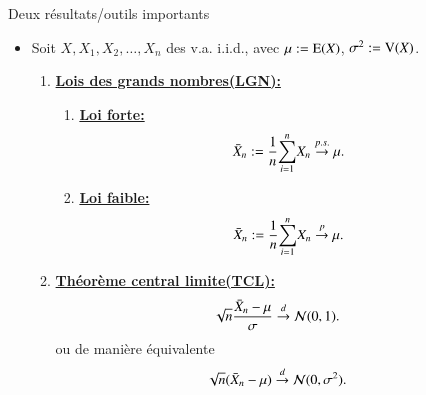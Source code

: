 \begin{frame}[allowframebreaks]{Deux résultats/outils importants}
    \begin{itemize}
        \item  Soit $X, X_1, X_2, \ldots, X_n$ des v.a. i.i.d., avec $\mu:=\operatorname{E}(X)$, 
    $\sigma^2 := \operatorname{V}(X)$.
    \begin{enumerate}
        \item \textbf{\underline{Lois des grands nombres(LGN):}}
        \begin{enumerate}[-]
            \item \textbf{\underline{Loi forte:}}
            \begin{align*}
                \bar{X}_n := \frac{1}{n}{\sum_{i=1}^n} X_n &\overset{p.s.}{\rightarrow}\mu.
            \end{align*}
            \item \textbf{\underline{Loi faible:}}
            \begin{align*}
                \bar{X}_n := \frac{1}{n}{\sum_{i=1}^n} X_n &\overset{p}{\rightarrow} \mu.
            \end{align*}
        \end{enumerate}
        \framebreak
        \item \textbf{\underline{Théorème central limite(TCL):}}
        \begin{align*}
            \sqrt{n}\frac{\bar{X}_n - \mu}{\sigma} &\overset{d}{\rightarrow} \mathcal{N}(0, 1).
        \end{align*}
        ou de manière équivalente
        \begin{align*}
            \sqrt{n}(\bar{X}_n - \mu) &\overset{d}{\rightarrow} \mathcal{N}(0, \sigma^2).
        \end{align*}
    \end{enumerate}
\end{itemize}
\end{frame}

